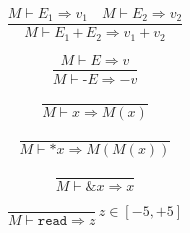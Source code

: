 \documentclass{article}
\begin{document}
\begin{displaymath}
  \frac{ M \vdash {E}_{1} \Rightarrow {v}_{1} \quad M \vdash {E}_{2} \Rightarrow {v}_{2}}{M \vdash {E}_{1} \, \texttt{+} \, {E}_{2} \Rightarrow {v}_{1} + {v}_{2}}
\end{displaymath}

\begin{displaymath}
  \frac{ M \vdash E \Rightarrow v}{M \vdash \texttt{-}E \Rightarrow -v}
\end{displaymath}

\begin{displaymath}
  \frac{ }{M \vdash x \Rightarrow M(x)}
\end{displaymath}

\begin{displaymath}
  \frac{ }{M \vdash *x \Rightarrow M(M(x))}
\end{displaymath}

\begin{displaymath}
  \frac{ }{M \vdash \&x \Rightarrow x}
\end{displaymath}

\begin{displaymath}
  \frac{ }{M \vdash \texttt{read} \Rightarrow z} \, z \in [-5, +5]
\end{displaymath}
\end{document}

